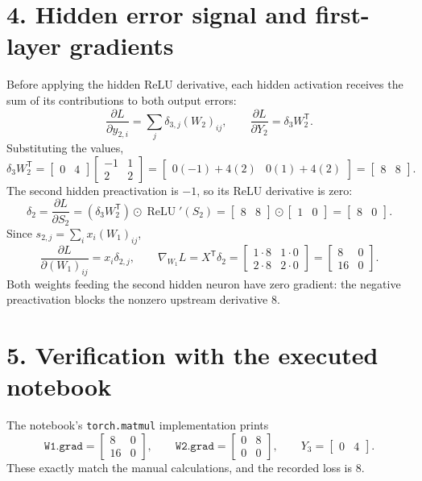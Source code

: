 \documentclass[11pt]{article}
\newcommand{\relu}{\operatorname{ReLU}}
\begin{document}
\section*{4. Hidden error signal and first-layer gradients}
Before applying the hidden ReLU derivative, each hidden activation
receives the sum of its contributions to both output errors:
\[
\frac{\partial L}{\partial y_{2,i}}
 =\sum_j\delta_{3,j}(W_2)_{ij},\qquad
\frac{\partial L}{\partial Y_2}=\delta_3W_2^{\mathsf T}.
\]
Substituting the values,
\[
\delta_3W_2^{\mathsf T}
 =\begin{bmatrix}0&4\end{bmatrix}
  \begin{bmatrix}-1&1\\2&2\end{bmatrix}
 =\begin{bmatrix}0(-1)+4(2)&0(1)+4(2)\end{bmatrix}
 =\begin{bmatrix}8&8\end{bmatrix}.
\]
The second hidden preactivation is $-1$, so its ReLU derivative is zero:
\[
\delta_2=\frac{\partial L}{\partial S_2}
 =(\delta_3W_2^{\mathsf T})\odot\relu'(S_2)
 =\begin{bmatrix}8&8\end{bmatrix}\odot\begin{bmatrix}1&0\end{bmatrix}
 =\begin{bmatrix}8&0\end{bmatrix}.
\]
Since $s_{2,j}=\sum_i x_i(W_1)_{ij}$,
\[
\frac{\partial L}{\partial(W_1)_{ij}}=x_i\delta_{2,j},\qquad
\boxed{\nabla_{W_1}L=X^{\mathsf T}\delta_2
 =\begin{bmatrix}1\cdot8&1\cdot0\\2\cdot8&2\cdot0\end{bmatrix}
 =\begin{bmatrix}8&0\\16&0\end{bmatrix}.}
\]
Both weights feeding the second hidden neuron have zero gradient:
the negative preactivation blocks the nonzero upstream derivative $8$.

\section*{5. Verification with the executed notebook}
The notebook's \texttt{torch.matmul} implementation prints
\[
\texttt{W1.grad}=\begin{bmatrix}8&0\\16&0\end{bmatrix},\qquad
\texttt{W2.grad}=\begin{bmatrix}0&8\\0&0\end{bmatrix},\qquad
Y_3=\begin{bmatrix}0&4\end{bmatrix}.
\]
These exactly match the manual calculations, and the recorded loss is $8$.
\end{document}
